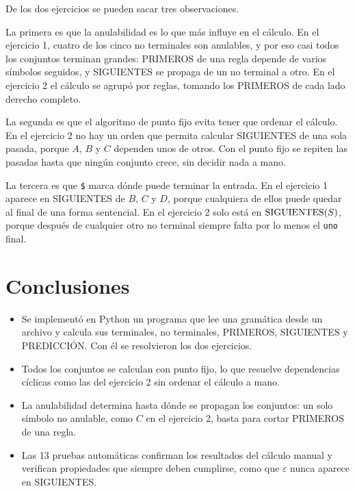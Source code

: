 \documentclass[12pt,letterpaper]{article}
\newcommand{\tk}[1]{\texttt{#1}}
\newcommand{\sig}{\textup{SIGUIENTES}}
\begin{document}
De los dos ejercicios se pueden sacar tres observaciones.

La primera es que la anulabilidad es lo que más influye en el cálculo. En el ejercicio 1, cuatro de los cinco no terminales son anulables, y por eso casi todos los conjuntos terminan grandes: PRIMEROS de una regla depende de varios símbolos seguidos, y SIGUIENTES se propaga de un no terminal a otro. En el ejercicio 2 el cálculo se agrupó por reglas, tomando los PRIMEROS de cada lado derecho completo.

La segunda es que el algoritmo de punto fijo evita tener que ordenar el cálculo. En el ejercicio 2 no hay un orden que permita calcular SIGUIENTES de una sola pasada, porque $A$, $B$ y $C$ dependen unos de otros. Con el punto fijo se repiten las pasadas hasta que ningún conjunto crece, sin decidir nada a mano.

La tercera es que \tk{\$} marca dónde puede terminar la entrada. En el ejercicio 1 aparece en SIGUIENTES de $B$, $C$ y $D$, porque cualquiera de ellos puede quedar al final de una forma sentencial. En el ejercicio 2 solo está en $\sig(S)$, porque después de cualquier otro no terminal siempre falta por lo menos el \tk{uno} final.

\section{Conclusiones}

\begin{itemize}
  \item Se implementó en Python un programa que lee una gramática desde un archivo y calcula sus terminales, no terminales, PRIMEROS, SIGUIENTES y PREDICCIÓN. Con él se resolvieron los dos ejercicios.
  \item Todos los conjuntos se calculan con punto fijo, lo que resuelve dependencias cíclicas como las del ejercicio 2 sin ordenar el cálculo a mano.
  \item La anulabilidad determina hasta dónde se propagan los conjuntos: un solo símbolo no anulable, como $C$ en el ejercicio 2, basta para cortar PRIMEROS de una regla.
  \item Las 13 pruebas automáticas confirman los resultados del cálculo manual y verifican propiedades que siempre deben cumplirse, como que $\varepsilon$ nunca aparece en SIGUIENTES.
\end{itemize}
\end{document}
